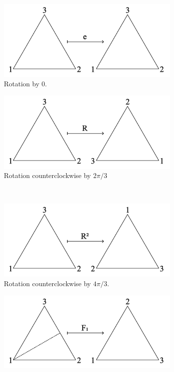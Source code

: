 \documentclass{amsart}
\begin{document}
\begin{example}
	\begin{figure}[!ht]
		\begin{subfigure}{.5\textwidth}
			\centering
			\includegraphics[width=.9\linewidth]{Inkscape Files/D3e.png}
			\caption{Rotation by \(0\).}
		\end{subfigure}%
		\begin{subfigure}{.5\textwidth}
			\centering
			\includegraphics[width=.9\linewidth]{Inkscape Files/D3R1.png}
			\caption{Rotation counterclockwise by \(2\pi/3\)}
		\end{subfigure}%
		\\
		\begin{subfigure}{.5\textwidth}
			\centering
			\includegraphics[width=.9\linewidth]{Inkscape Files/D3R2.png}
			\caption{Rotation counterclockwise by \(4\pi/3\).}
		\end{subfigure}%
		\begin{subfigure}{.5\textwidth}
			\centering
			\includegraphics[width=.9\linewidth]{Inkscape Files/D3F1.png}

\end{subfigure}
\end{figure}
\end{example}
\end{document}
